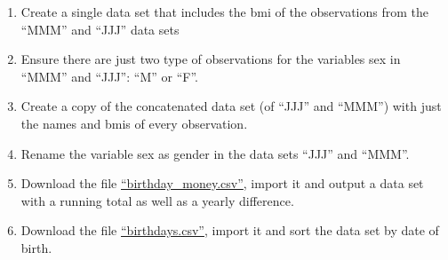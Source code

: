 \documentclass[12pt]{article}
\begin{document}
\begin{enumerate}
\item Create a single data set that includes the bmi of the observations from the ``MMM'' and ``JJJ'' data sets  
\item Ensure there are just two type of observations for the variables sex in ``MMM'' and ``JJJ'': ``M'' or ``F''. 
\item Create a copy of the concatenated data set (of ``JJJ'' and ``MMM'') with just the names and bmis of every observation.
\item Rename the variable sex as gender in the data sets ``JJJ'' and ``MMM''. 
\item Download the file \href{https://docs.google.com/file/d/0Bx_zrw5uAafbdXNyYzMwVTFfUk0/edit}{``birthday\_money.csv''}, import it and output a data set with a running total as well as a yearly difference.
\item Download the file \href{https://docs.google.com/file/d/0Bx_zrw5uAafbWnBzY3NScURsLTg/edit}{``birthdays.csv''}, import it and sort the data set by date of birth.
\end{enumerate}
\end{document}
